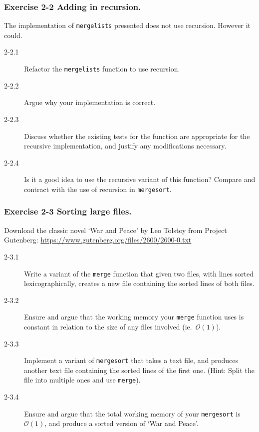 \documentclass{beamer} %
\begin{document}
\begin{frame}
\frametitle{Exercise 2-2 Adding in recursion.}

The implementation of \texttt{mergelists} presented does not use recursion. However it could.
\begin{description}
	\item[2-2.1] Refactor the \texttt{mergelists} function to use recursion.
	\item[2-2.2] Argue why your implementation is correct.
	\item[2-2.3] Discuss whether the existing tests for the function are appropriate for the recursive implementation, and justify any modifications necessary.
	\item[2-2.4] Is it a good idea to use the recursive variant of this function? Compare and contract with the use of recursion in \texttt{mergesort}.
\end{description}

\end{frame}

\begin{frame}
\frametitle{Exercise 2-3 Sorting large files.}

Download the classic novel `War and Peace' by Leo Tolstoy from Project Gutenberg: \url{https://www.gutenberg.org/files/2600/2600-0.txt}
\begin{description}
	\item[2-3.1] Write a variant of the \texttt{merge} function that given two files, with lines sorted lexicographically, creates a new file containing the sorted lines of both files.
	\item[2-3.2] Ensure and argue that the working memory your \texttt{merge} function uses is constant in relation to the size of any files involved (ie.\ $\mathcal{O}(1)$).
	\item[2-3.3] Implement a variant of \texttt{mergesort} that takes a text file, and produces another text file containing the sorted lines of the first one. (Hint: Split the file into multiple ones and use \texttt{merge}).
	\item[2-3.4] Ensure and argue that the total working memory of your \texttt{mergesort} is $\mathcal{O}(1)$, and produce a sorted version of `War and Peace'.
\end{description}

\end{frame}
\end{document}

